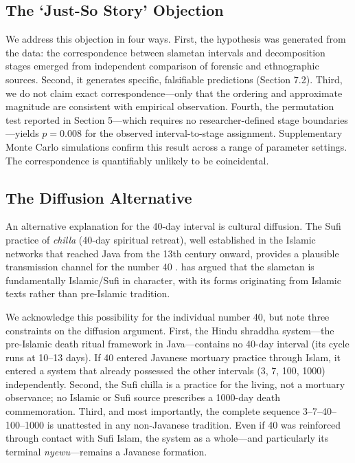 \documentclass[12pt,a4paper]{article}
\begin{document}
\subsection{The `Just-So Story' Objection}

We address this objection in four ways. First, the hypothesis was generated from the data: the correspondence between slametan intervals and decomposition stages emerged from independent comparison of forensic and ethnographic sources. Second, it generates specific, falsifiable predictions (Section 7.2). Third, we do not claim exact correspondence---only that the ordering and approximate magnitude are consistent with empirical observation. Fourth, the permutation test reported in Section 5---which requires no researcher-defined stage boundaries---yields $p = 0.008$ for the observed interval-to-stage assignment. Supplementary Monte Carlo simulations confirm this result across a range of parameter settings. The correspondence is quantifiably unlikely to be coincidental.

\subsection{The Diffusion Alternative}

An alternative explanation for the 40-day interval is cultural diffusion. The Sufi practice of \textit{chilla} (40-day spiritual retreat), well established in the Islamic networks that reached Java from the 13th century onward, provides a plausible transmission channel for the number 40 \citep{woodward_1989}. \citet{woodward_1989} has argued that the slametan is fundamentally Islamic/Sufi in character, with its forms originating from Islamic texts rather than pre-Islamic tradition.

We acknowledge this possibility for the individual number 40, but note three constraints on the diffusion argument. First, the Hindu shraddha system---the pre-Islamic death ritual framework in Java---contains no 40-day interval (its cycle runs at 10--13 days). If 40 entered Javanese mortuary practice through Islam, it entered a system that already possessed the other intervals (3, 7, 100, 1000) independently. Second, the Sufi chilla is a practice for the living, not a mortuary observance; no Islamic or Sufi source prescribes a 1000-day death commemoration. Third, and most importantly, the complete sequence 3--7--40--100--1000 is unattested in any non-Javanese tradition. Even if 40 was reinforced through contact with Sufi Islam, the system as a whole---and particularly its terminal \textit{nyewu}---remains a Javanese formation.
\end{document}
